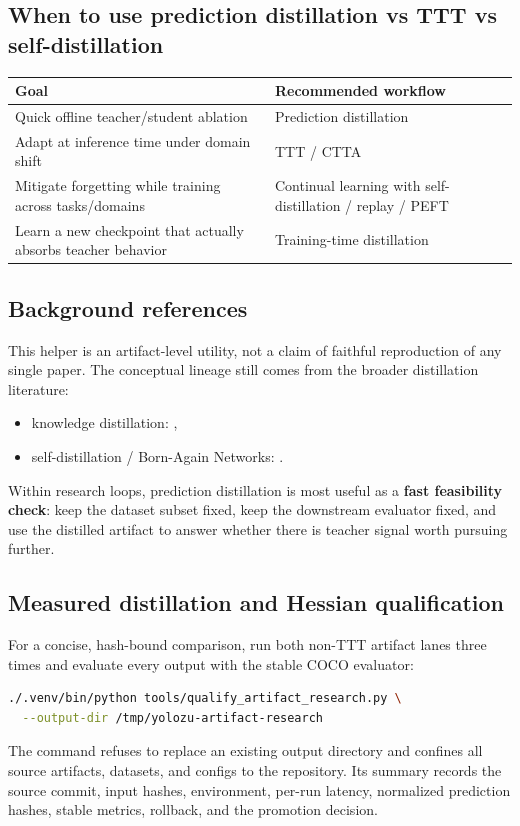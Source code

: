 \subsection{When to use prediction distillation vs TTT vs self-distillation}
\begin{longtable}{@{}p{}p{}@{}}
\toprule
\textbf{Goal} & \textbf{Recommended workflow} \\
\midrule
Quick offline teacher/student ablation & Prediction distillation \\
Adapt at inference time under domain shift & TTT / CTTA \\
Mitigate forgetting while training across tasks/domains & Continual learning with self-distillation / replay / PEFT \\
Learn a new checkpoint that actually absorbs teacher behavior & Training-time distillation \\
\bottomrule
\end{longtable}

\subsection{Background references}
This helper is an artifact-level utility, not a claim of faithful reproduction of any single paper.
The conceptual lineage still comes from the broader distillation literature:
\begin{itemize}
  \item knowledge distillation: \cite{hinton2015distilling},
  \item self-distillation / Born-Again Networks: \cite{furlanello2018bornagain}.
\end{itemize}

Within research loops, prediction distillation is most useful as a \textbf{fast feasibility check}:
keep the dataset subset fixed, keep the downstream evaluator fixed, and use the distilled artifact to answer whether there is teacher signal worth pursuing further.

\subsection{Measured distillation and Hessian qualification}
For a concise, hash-bound comparison, run both non-TTT artifact lanes three
times and evaluate every output with the stable COCO evaluator:
\begin{lstlisting}[language=bash]
./.venv/bin/python tools/qualify_artifact_research.py \
  --output-dir /tmp/yolozu-artifact-research
\end{lstlisting}
The command refuses to replace an existing output directory and confines all
source artifacts, datasets, and configs to the repository. Its summary records
the source commit, input hashes, environment, per-run latency, normalized
prediction hashes, stable metrics, rollback, and the promotion decision.

